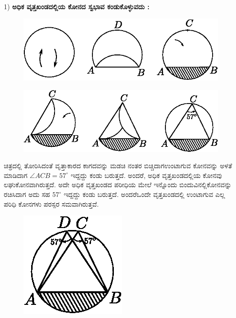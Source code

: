   \eject
    \begin{itemize}
  \item[1)] \textbf{ಅಧಿಕ ವೃತ್ತಖಂಡದಲ್ಲಿಯ ಕೋನದ ಸ್ವಭಾವ ಕಂಡುಕೊಳ್ಳುವದು :}
  \begin{figure}[H]
\centering
\includegraphics[scale=.98]{src/figure/chap1/fig1-29a.eps}
\end{figure}
\begin{figure}[H]
\centering
\includegraphics[scale=.98]{src/figure/chap1/fig1-29b.eps}
\end{figure}
 
 ಚಿತ್ರದಲ್ಲಿ ತೋರಿಸಿದಂತೆ ವೃತ್ತಾಕಾರದ ಕಾಗದವನ್ನು ಮಡಚಿ ನಂತರ ಬಿಚ್ಚಿದಾಗ\break ಉಂಟಾಗುವ ಕೋನವನ್ನು ಅಳತೆ ಮಾಡಿದಾಗ $\angle ACB = 57^\circ$ ಇದ್ದದ್ದು ಕಂಡು ಬರುತ್ತದೆ. ಅಂದರೆ, ಅಧಿಕ ವೃತ್ತಖಂಡದಲ್ಲಿಯ ಕೋನವು ಲಘುಕೋನವಾಗಿರುತ್ತದೆ. ಅದೇ ಅಧಿಕ ವೃತ್ತಖಂಡದ ಪರೀಧಿಯ ಮೇಲೆ ಇನ್ನೊಂದು ಬಿಂದುವಿನಲ್ಲಿ\break ಕೋನವನ್ನು ರಚಿಸಿದಾಗ ಅದು ಸಹ $57^\circ$ ಇದ್ದದ್ದು ಕಂಡು ಬರುತ್ತದೆ. ಅಂದರೆ\break ಒಂದೇ ವೃತ್ತಖಂಡದಲ್ಲಿ ಉಂಟಾಗುವ ಎಲ್ಲ ಪರಿಧಿ ಕೋನಗಳು ಪರಸ್ಪರ ಸಮ\break ವಾಗಿರುತ್ತವೆ. 
 \begin{figure}[H]
\centering
\includegraphics[scale=.98]{src/figure/chap1/fig1-29c.eps}
\end{figure}


\end{itemize}

